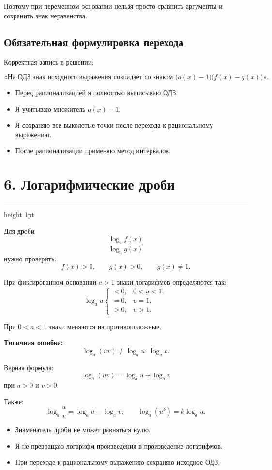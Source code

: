 \documentclass[a4paper,12pt]{article}
\newcommand{\checkitem}{\item[$\square$]}
\newcommand{\important}[1]{\textcolor{darkaccent}{\textbf{#1}}}
\newcommand{\sectionrule}{%
  \vspace{-2mm}
  {\color{lightaccent}\hrule height 1pt}
  \vspace{3mm}
}
\begin{document}
Поэтому при переменном основании нельзя просто сравнить аргументы
и сохранить знак неравенства.

\subsection*{\textcolor{accent}{Обязательная формулировка перехода}}

Корректная запись в решении:

\[
\text{«На ОДЗ знак исходного выражения совпадает со знаком }
\bigl(a(x)-1\bigr)\bigl(f(x)-g(x)\bigr)\text{».}
\]

\begin{itemize}
  \checkitem Перед рационализацией я полностью выписываю ОДЗ.
  \checkitem Я учитываю множитель \(a(x)-1\).
  \checkitem Я сохраняю все выколотые точки после перехода к рациональному выражению.
  \checkitem После рационализации применяю метод интервалов.
\end{itemize}


\section*{\textcolor{darkaccent}{6. Логарифмические дроби}}
\sectionrule

Для дроби
\[
\frac{\log_a f(x)}{\log_a g(x)}
\]
нужно проверить:
\[
f(x)>0,\qquad
g(x)>0,\qquad
g(x)\ne1.
\]

При фиксированном основании \(a>1\) знаки логарифмов определяются так:
\[
\log_a u
\begin{cases}
<0,&0<u<1,\\
=0,&u=1,\\
>0,&u>1.
\end{cases}
\]

При \(0<a<1\) знаки меняются на противоположные.

\important{Типичная ошибка:}
\[
\log_a(uv)\ne\log_a u\cdot\log_a v.
\]

Верная формула:
\[
\boxed{\log_a(uv)=\log_a u+\log_a v}
\]
при \(u>0\) и \(v>0\).

Также:
\[
\log_a\frac{u}{v}=\log_a u-\log_a v,
\qquad
\log_a(u^k)=k\log_a u.
\]

\begin{itemize}
  \checkitem Знаменатель дроби не может равняться нулю.
  \checkitem Я не превращаю логарифм произведения в произведение логарифмов.
  \checkitem При переходе к рациональному выражению сохраняю исходное ОДЗ.
\end{itemize}
\end{document}
